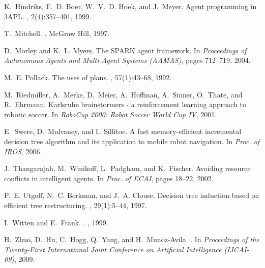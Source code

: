 \documentclass{aamas2010_cameraReady}
\begin{document}
\begin{thebibliography}{10}
K.~Hindriks, F.~D. Boer, W.~V.~D. Hoek, and J.~Meyer.
\newblock Agent programming in {3APL}.
, 2(4):357--401, 1999.

T.~Mitchell.
.
\newblock McGraw Hill, 1997.

D.~Morley and K.~L. Myers.
\newblock The {SPARK} agent framework.
\newblock In {\em Proceedings of Autonomous Agents and Multi-Agent Systems
  (AAMAS)}, pages 712--719, 2004.

M.~E. Pollack.
\newblock The uses of plans.
, 57(1):43--68, 1992.

M.~Riedmiller, A.~Merke, D.~Meier, A.~Hoffman, A.~Sinner, O.~Thate, and
  R.~Ehrmann.
\newblock Karlsruhe brainstormers - a reinforcement learning approach to
  robotic soccer.
\newblock In {\em {RoboCup} 2000: Robot Soccer World Cup {IV}}, 2001.

E.~Swere, D.~Mulvaney, and I.~Sillitoe.
\newblock A fast memory-efficient incremental decision tree algorithm and its
  application to mobile robot navigation.
\newblock In {\em Proc. of IROS}, 2006.

J.~Thangarajah, M.~Winikoff, L.~Padgham, and K.~Fischer.
\newblock Avoiding resource conflicts in intelligent agents.
\newblock In {\em Proc. of ECAI}, pages 18--22, 2002.

P.~E. Utgoff, N.~C. Berkman, and J.~A. Clouse.
\newblock Decision tree induction based on efficient tree restructuring.
, 29(1):5--44, 1997.

I.~Witten and E.~Frank.
.
, 1999.

H.~Zhuo, D.~Hu, C.~Hogg, Q.~Yang, and H.~Munoz-Avila.
.
\newblock In {\em Proceedings of the Twenty-First International Joint
  Conference on Artificial Intelligence (IJCAI-09)}, 2009.



\end{thebibliography}
\end{document}
